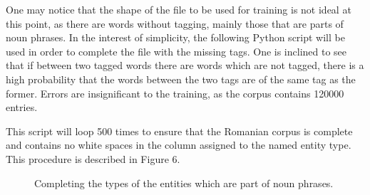 \documentclass[12pt,a4paper]{article}
\begin{document}
\qquad One may notice that the shape of the file to be used for training is not ideal at this point, as there are words without tagging, mainly those that are parts of noun phrases. In the interest of simplicity, the following Python script will be used in order to complete the file with the missing tags. One is inclined to see that if between two tagged words there are words which are not tagged, there is a high probability that the words between the two tags are of the same tag as the former. Errors are insignificant to the training, as the corpus contains 120000 entries.

\qquad This script will loop 500 times to ensure that the Romanian corpus is complete and contains no white spaces in the column assigned to the named entity type. This procedure is described in Figure 6.

\begin{figure}[h!]
\begin{center}
 
\caption{Completing the types of the entities which are part of noun phrases.}
\end{center}

\end{figure}
\end{document}
